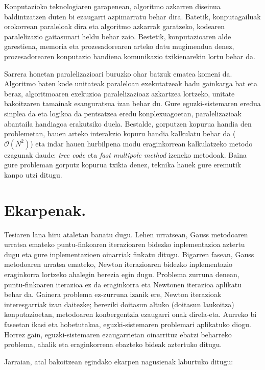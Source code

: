 Konputazioko teknologiaren garapenean, algoritmo azkarren diseinua baldintzatzen duten bi ezaugarri azpimarratu behar dira. Batetik, konputagailuak orokorrean paraleloak dira eta algoritmo azkarrak garatzeko, kodearen paralelizazio gaitasunari heldu behar zaio. Bestetik, konputazioaren alde garestiena, memoria eta prozesadorearen arteko datu mugimendua denez, prozesadorearen konputazio handiena komunikazio txikienarekin lortu behar da. 

Sarrera honetan paralelizazioari buruzko ohar batzuk ematea komeni da. Algoritmo baten kode unitateak paraleloan exekutatzeak badu gainkarga bat eta beraz,  algoritmoaren exekuzioa paralelizazioaz azkartzea lortzeko,  unitate bakoitzaren tamainak esanguratsua izan behar du. Gure eguzki-sistemaren eredua sinplea da eta logikoa da pentsatzea eredu konplexuagoetan, paralelizazioak abantaila handiagoa erakutsiko duela. Bestalde, gorputzen kopurua handia den problemetan, hauen arteko interakzio kopuru  handia kalkulatu behar da ($\mathcal{O}(N^2)$) eta indar hauen hurbilpena modu eraginkorrean kalkulatzeko metodo ezagunak daude: \textit {tree code}\cite{Barnes1986} eta \textit {fast multipole method}\cite{Carrier1988} izeneko metodoak. Baina gure probleman gorputz kopurua txikia denez, teknika hauek gure eremutik kanpo utzi ditugu. 


\section{Ekarpenak.}

Tesiaren lana hiru ataletan banatu dugu. Lehen urratsean, Gauss metodoaren urratsa emateko puntu-finkoaren iterazioaren  bidezko inplementazioa aztertu dugu eta gure inplementazioen oinarriak finkatu ditugu. Bigarren fasean, Gauss metodoaren urratsa emateko, Newton iterazioaren bidezko inplementazio eraginkorra lortzeko ahalegin berezia egin dugu. Problema zurruna denean, puntu-finkoaren iterazioa ez da eraginkorra eta Newtonen iterazioa aplikatu behar da. Gainera problema ez-zurruna izanik ere, Newton iterazioak interesgarriak izan daitezke; bereziki doitasun altuko (doitasun laukoitza) konputazioetan, metodoaren konbergentzia ezaugarri onak direla-eta.  Aurreko bi faseetan ikasi eta hobetutakoa, eguzki-sistemaren problemari aplikatuko diogu. Horrez gain, eguzki-sistemaren ezaugarrietan oinarrituz ebatzi beharreko problema, ahalik eta eraginkorrena ebazteko bideak aztertuko ditugu.

Jarraian, atal bakoitzean egindako ekarpen nagusienak laburtuko ditugu:

